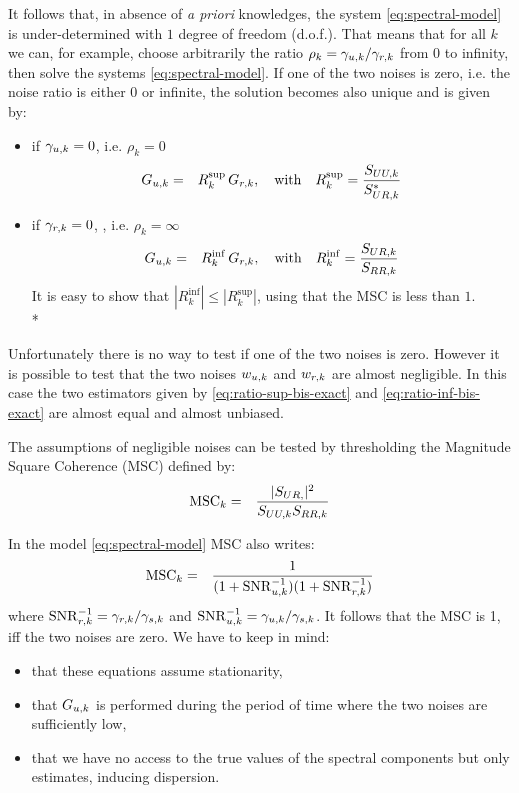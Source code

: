 It follows that, in absence of {\it a priori} knowledges,  the system \eqref{eq:spectral-model} is under-determined with $1$ degree of freedom (d.o.f.). That means that for all $k$ we can, for example,  choose arbitrarily the ratio $\rho_{k}=\gamma_{{u},k}/\gamma_{{r},k}$ from $0$ to infinity, then solve the systems \eqref{eq:spectral-model}. If one of the two noises is zero, i.e. the noise ratio is either 0 or infinite, the solution becomes also unique and is given by:





\begin{itemize}
\item
if $\gamma_{{u},k}=0$, i.e. $\rho_{k}=0$
\begin{eqnarray}
\label{eq:ratio-sup-bis-exact}
{G_{{u},k}}&=&R_{k}^{\sup}\,G_{{r},k}, \quad \mathrm{with}\quad
R_{k}^{\sup} = \frac{{S_{UU,k}}}{{S^*_{UR,k}}}
\end{eqnarray}
\item
if $\gamma_{{r},k}=0$, , i.e. $\rho_{k}=\infty$
\begin{eqnarray}
\label{eq:ratio-inf-bis-exact}
{G_{{u},k}}&=&R_{k}^{\inf}\,G_{{r},k}, \quad \mathrm{with}\quad
R_{k}^{\inf}=\frac{{S_{UR,k}}}{{S_{RR,k}}}
\end{eqnarray}
It is easy to show that $|R_{k}^{\inf}|\leq |R_{k}^{\sup}|$, using that the MSC is less than $1$.\\*
\end{itemize}

 Unfortunately there is no way to test if one of the two noises is zero. However it is possible to test that the two noises $w_{{u},k}$ and $w_{{r},k}$ are almost negligible. In this case the two estimators given by \eqref{eq:ratio-sup-bis-exact} and \eqref{eq:ratio-inf-bis-exact} are almost equal and almost unbiased. 

The assumptions of negligible noises can be tested by thresholding the Magnitude Square Coherence (MSC) defined by:
\begin{eqnarray}
 \label{eq:MSC-continuous-frequency}
 \mathrm{MSC}_{k} &=& \frac{|S_{UR,}|^{2}}{S_{UU,k}S_{RR,k}}
\end{eqnarray}
 
In the model \eqref{eq:spectral-model} MSC also writes:
\begin{eqnarray}
\label{eq:coherence-in-our-model}
 \mathrm{MSC}_{k} &=& \frac{1}{(1+\mathrm{SNR}^{-1}_{{u},k})(1+\mathrm{SNR}^{-1}_{{r},k})}
\end{eqnarray}
where $\mathrm{SNR}^{-1}_{{r},k}=\gamma_{{r},k}/\gamma_{s,k}$ and $\mathrm{SNR}^{-1}_{{u},k}=\gamma_{{u},k}/\gamma_{s,k}$. It follows that the MSC is 1, iff the two noises are zero. We have to keep in mind:
\begin{itemize}
\item
that these equations assume stationarity,
\item
that $G_{{u},k}$ is performed during the period of time where the two noises are sufficiently low,
\item
that we have no access to the true values of the spectral components but only estimates, inducing dispersion. 
\end{itemize}



